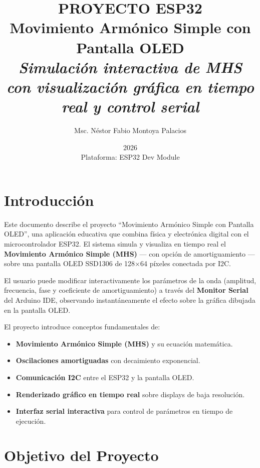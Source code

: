 \documentclass[12pt,a4paper]{article}
\title{\Huge\textbf{PROYECTO ESP32} \\ \Large Movimiento Armónico Simple con Pantalla OLED \\ \vspace{0.5cm} \normalsize \textit{Simulación interactiva de MHS con visualización gráfica en tiempo real y control serial}}
\author{Msc. Néstor Fabio Montoya Palacios}
\date{2026 \\ \vspace{0.2cm} \small Plataforma: ESP32 Dev Module}
\begin{document}
\maketitle
\tableofcontents
\newpage

\section{Introducción}

Este documento describe el proyecto ``Movimiento Armónico Simple con Pantalla OLED'', una aplicación educativa que combina física y electrónica digital con el microcontrolador ESP32. El sistema simula y visualiza en tiempo real el \textbf{Movimiento Armónico Simple (MHS)} --- con opción de amortiguamiento --- sobre una pantalla OLED SSD1306 de 128$\times$64 píxeles conectada por I2C.

El usuario puede modificar interactivamente los parámetros de la onda (amplitud, frecuencia, fase y coeficiente de amortiguamiento) a través del \textbf{Monitor Serial} del Arduino IDE, observando instantáneamente el efecto sobre la gráfica dibujada en la pantalla OLED.

El proyecto introduce conceptos fundamentales de:
\begin{itemize}
    \item \textbf{Movimiento Armónico Simple (MHS)} y su ecuación matemática.
    \item \textbf{Oscilaciones amortiguadas} con decaimiento exponencial.
    \item \textbf{Comunicación I2C} entre el ESP32 y la pantalla OLED.
    \item \textbf{Renderizado gráfico en tiempo real} sobre displays de baja resolución.
    \item \textbf{Interfaz serial interactiva} para control de parámetros en tiempo de ejecución.
\end{itemize}

\section{Objetivo del Proyecto}
\end{document}
